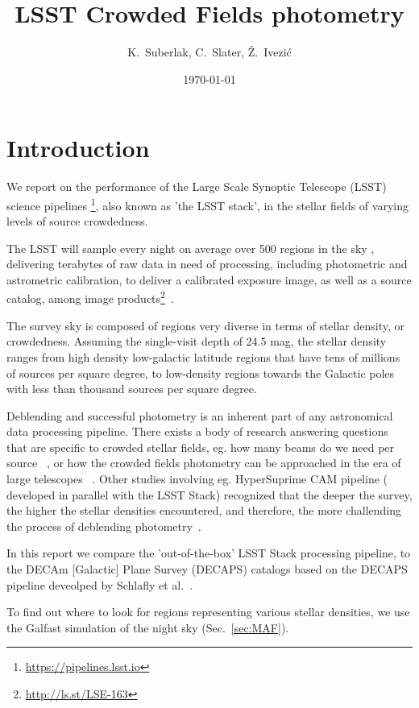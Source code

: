 \documentclass[DM,lsstdraft,toc,usenatbib]{lsstdoc}
\title[Crowded fields ]{LSST  Crowded Fields photometry}
\author{
K.~Suberlak, C.~Slater, \v{Z}.~Ivezi\'c}
\date{\today}
\begin{document}
\maketitle

\section{Introduction}

We report on the performance of the Large Scale Synoptic Telescope (LSST) science pipelines \footnote{\url{https://pipelines.lsst.io}}, also known as 'the LSST stack', in the stellar fields of varying levels of source crowdedness.

The LSST will sample every night on average over 500  regions in the sky , delivering terabytes of raw data in need of processing, including photometric  and astrometric calibration, to deliver a calibrated exposure image, as well as a source catalog, among image products\footnote{\url{http://ls.st/LSE-163}}~\cite{narayan2018}.

The survey sky is composed of regions very diverse in terms of stellar density, or crowdedness. Assuming the single-visit depth of 24.5 mag, the stellar density ranges from high density low-galactic latitude regions that have tens of millions of sources per square degree, to low-density regions towards the Galactic poles with less than thousand sources per square degree. 

Deblending and successful photometry is an inherent part of any astronomical data processing pipeline.  There exists a body of research answering questions that are specific to crowded stellar fields, eg. how many beams do we need per source ~\citep{hogg2001}, or how  the crowded fields photometry can be approached in the era of large telescopes ~\cite{olsen2003}. Other studies involving eg. HyperSuprime CAM pipeline ( developed in parallel with the LSST Stack) recognized that the deeper the survey, the higher the stellar densities encountered, and therefore, the more challending the process of deblending photometry~\cite{bosch2017}.

In this report we compare the 'out-of-the-box' LSST Stack processing pipeline, to the DECAm [Galactic] Plane Survey (DECAPS) catalogs based on the DECAPS pipeline deveolped by Schlafly et al.~\cite{schlafly2017}. 

To find out where to look for regions representing various stellar densities, we use the Galfast simulation of the night sky (Sec.~\ref{sec:MAF}). 
\end{document}
